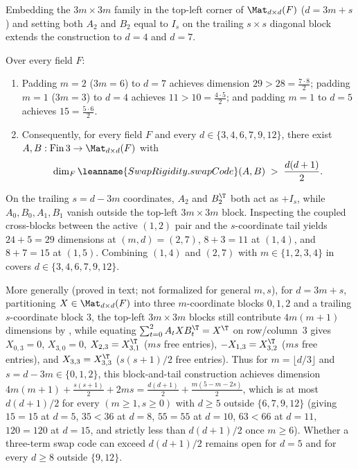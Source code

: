 Embedding the $3m \times 3m$ family in the top-left corner of $\Mat_{d\times d}(F)$ ($d = 3m + s$)
and setting both $A_2$ and $B_2$ equal to $I_s$ on the trailing $s \times s$ diagonal block extends
the construction to $d = 4$ and $d = 7$.

\begin{theorem}\label{thm:three-term-unified}
Over every field $F$:
\begin{enumerate}[label=(\alph*)]
\item Padding $m = 2$ ($3m = 6$) to $d = 7$ achieves dimension $29 > 28 = \frac{7 \cdot 8}{2}$;
  padding $m = 1$ ($3m = 3$) to $d = 4$ achieves $11 > 10 = \frac{4 \cdot 5}{2}$; and padding
  $m = 1$ to $d = 5$ achieves $15 = \frac{5 \cdot 6}{2}$.
\item Consequently, for every field $F$ and every $d \in \{3, 4, 6, 7, 9, 12\}$, there exist
  $A, B : \mathrm{Fin}\,3 \to \Mat_{d\times d}(F)$ with
  \[
    \dim_F \leanname{SwapRigidity.swapCode}(A, B) \;>\; \frac{d(d+1)}{2}.
  \]
\end{enumerate}
\end{theorem}
\begin{outline}
On the trailing $s = d - 3m$ coordinates, $A_2$ and $B_2^{\T}$ both act as $+I_s$, while $A_0, B_0,
A_1, B_1$ vanish outside the top-left $3m \times 3m$ block. Inspecting the coupled cross-blocks
between the active $(1,2)$ pair and the $s$-coordinate tail yields $24 + 5 = 29$ dimensions at
$(m, d) = (2, 7)$, $8 + 3 = 11$ at $(1, 4)$, and $8 + 7 = 15$ at $(1, 5)$. Combining $(1,4)$ and
$(2,7)$ with $m \in \{1, 2, 3, 4\}$ in  covers
$d \in \{3, 4, 6, 7, 9, 12\}$.
\end{outline}

More generally (proved in text; not formalized for general $m, s$), for $d = 3m + s$, partitioning
$X \in \Mat_{d\times d}(F)$ into three $m$-coordinate blocks $0, 1, 2$ and a trailing
$s$-coordinate block $3$, the top-left $3m \times 3m$ blocks still contribute $4m(m+1)$ dimensions by
, while equating $\sum_{t=0}^2 A_t X B_t^{\T} = X^{\T}$ on row/column~$3$
gives $X_{0,3} = 0$, $X_{3,0} = 0$, $X_{2,3} = X_{3,1}^{\T}$ ($ms$ free entries),
$-X_{1,3} = X_{3,2}^{\T}$ ($ms$ free entries), and $X_{3,3} = X_{3,3}^{\T}$ ($s(s+1)/2$ free entries).
Thus for $m = \lfloor d/3\rfloor$ and $s = d - 3m \in \{0, 1, 2\}$, this block-and-tail construction
achieves dimension
$4m(m+1) + \frac{s(s+1)}{2} + 2ms = \frac{d(d+1)}{2} + \frac{m(5 - m - 2s)}{2}$, which is at most
$d(d+1)/2$ for every $(m \ge 1, s \ge 0)$ with $d \ge 5$ outside $\{6, 7, 9, 12\}$ (giving
$15 = 15$ at $d = 5$, $35 < 36$ at $d = 8$, $55 = 55$ at $d = 10$, $63 < 66$ at $d = 11$,
$120 = 120$ at $d = 15$, and strictly less than $d(d+1)/2$ once $m \ge 6$). Whether a three-term swap
code can exceed $d(d+1)/2$ remains open for $d = 5$ and for every $d \ge 8$ outside $\{9, 12\}$.

